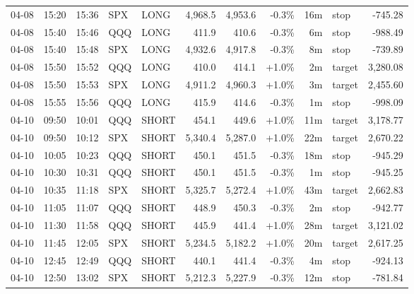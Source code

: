 \documentclass[11pt,a4paper,twoside]{article}
\begin{document}
\begin{center}
\begin{longtable}{>{\color{txtmain}}l l l l l r r r r >{\color{txtmain}}l r}
04-08 & 15:20 & 15:36 & SPX & LONG & 4,968.5 & 4,953.6 & \textcolor{lossred}{-0.3\%} & 16m & stop & \textcolor{lossred}{-745.28} \\
04-08 & 15:40 & 15:46 & QQQ & LONG & 411.9 & 410.6 & \textcolor{lossred}{-0.3\%} & 6m & stop & \textcolor{lossred}{-988.49} \\
04-08 & 15:40 & 15:48 & SPX & LONG & 4,932.6 & 4,917.8 & \textcolor{lossred}{-0.3\%} & 8m & stop & \textcolor{lossred}{-739.89} \\
04-08 & 15:50 & 15:52 & QQQ & LONG & 410.0 & 414.1 & \textcolor{wingreen}{+1.0\%} & 2m & target & \textcolor{wingreen}{3,280.08} \\
04-08 & 15:50 & 15:53 & SPX & LONG & 4,911.2 & 4,960.3 & \textcolor{wingreen}{+1.0\%} & 3m & target & \textcolor{wingreen}{2,455.60} \\
04-08 & 15:55 & 15:56 & QQQ & LONG & 415.9 & 414.6 & \textcolor{lossred}{-0.3\%} & 1m & stop & \textcolor{lossred}{-998.09} \\
04-10 & 09:50 & 10:01 & QQQ & SHORT & 454.1 & 449.6 & \textcolor{wingreen}{+1.0\%} & 11m & target & \textcolor{wingreen}{3,178.77} \\
04-10 & 09:50 & 10:12 & SPX & SHORT & 5,340.4 & 5,287.0 & \textcolor{wingreen}{+1.0\%} & 22m & target & \textcolor{wingreen}{2,670.22} \\
04-10 & 10:05 & 10:23 & QQQ & SHORT & 450.1 & 451.5 & \textcolor{lossred}{-0.3\%} & 18m & stop & \textcolor{lossred}{-945.29} \\
04-10 & 10:30 & 10:31 & QQQ & SHORT & 450.1 & 451.5 & \textcolor{lossred}{-0.3\%} & 1m & stop & \textcolor{lossred}{-945.25} \\
04-10 & 10:35 & 11:18 & SPX & SHORT & 5,325.7 & 5,272.4 & \textcolor{wingreen}{+1.0\%} & 43m & target & \textcolor{wingreen}{2,662.83} \\
04-10 & 11:05 & 11:07 & QQQ & SHORT & 448.9 & 450.3 & \textcolor{lossred}{-0.3\%} & 2m & stop & \textcolor{lossred}{-942.77} \\
04-10 & 11:30 & 11:58 & QQQ & SHORT & 445.9 & 441.4 & \textcolor{wingreen}{+1.0\%} & 28m & target & \textcolor{wingreen}{3,121.02} \\
04-10 & 11:45 & 12:05 & SPX & SHORT & 5,234.5 & 5,182.2 & \textcolor{wingreen}{+1.0\%} & 20m & target & \textcolor{wingreen}{2,617.25} \\
04-10 & 12:45 & 12:49 & QQQ & SHORT & 440.1 & 441.4 & \textcolor{lossred}{-0.3\%} & 4m & stop & \textcolor{lossred}{-924.13} \\
04-10 & 12:50 & 13:02 & SPX & SHORT & 5,212.3 & 5,227.9 & \textcolor{lossred}{-0.3\%} & 12m & stop & \textcolor{lossred}{-781.84} \\

\end{longtable}
\end{center}
\end{document}
